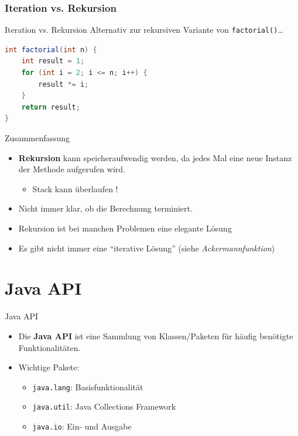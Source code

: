 \documentclass[18pt]{beamer}
\newcommand{\quotes}[1]{``#1''}
\begin{document}
\subsubsection{Iteration vs. Rekursion}

\begin{frame}[fragile]{Iteration vs. Rekursion}
    Alternativ zur rekursiven Variante von \texttt{factorial()}\dots
    \begin{exampleblock}{}
        \begin{lstlisting}[language=Java,basicstyle=\scriptsize]
int factorial(int n) {
    int result = 1;
    for (int i = 2; i <= n; i++) {
        result *= i;
    }
    return result;
}
        \end{lstlisting}

    \end{exampleblock}
\end{frame}

\begin{frame}{Zusammenfassung}
    \begin{itemize}
        \item \textbf{Rekursion} kann speicheraufwendig werden, da jedes Mal eine neue Instanz der Methode aufgerufen wird.
        \begin{itemize}
            \item Stack kann überlaufen !
        \end{itemize}
        \item Nicht immer klar, ob die Berechnung terminiert.
        \item Rekursion ist bei manchen Problemen eine elegante Lösung
        \item Es gibt nicht immer eine \quotes{iterative Lösung} (siehe \textit{Ackermannfunktion})
    \end{itemize}
\end{frame}


\section{Java API}

\begin{frame}{Java API}
    \begin{itemize}
        \item Die \textbf{Java API} ist eine Sammlung von Klassen/Paketen für häufig benötigte Funktionalitäten.
        \vspace{.3in}
        \item Wichtige Pakete:

    \begin{itemize}
        \item \texttt{java.lang}: Basisfunktionalität
        \item \texttt{java.util}: Java Collections Framework
        \item \texttt{java.io}: Ein- und Ausgabe
    \end{itemize}

    \end{itemize}

\end{frame}
\end{document}
